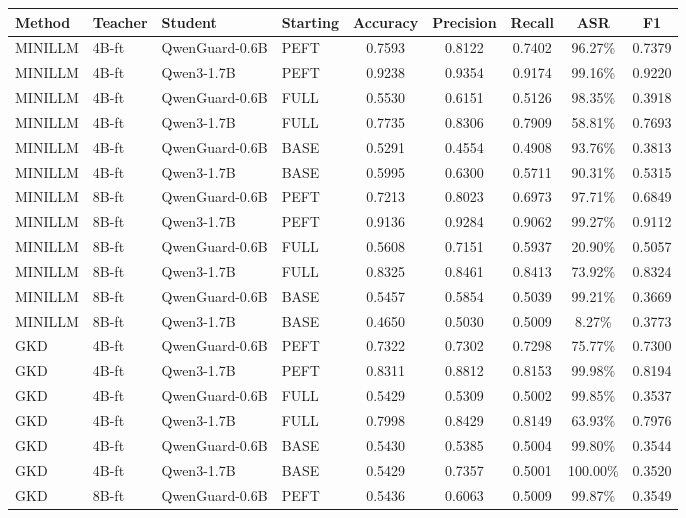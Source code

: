 \begin{table}[t]
\centering
\small
\begin{tabular}{llllccccc}
\toprule
Method & Teacher & Student & Starting & Accuracy & Precision & Recall & ASR & F1 \\
\midrule
MINILLM & 4B-ft & QwenGuard-0.6B & PEFT & 0.7593 & 0.8122 & 0.7402 & 96.27\% & 0.7379 \\
MINILLM & 4B-ft & Qwen3-1.7B & PEFT & 0.9238 & 0.9354 & 0.9174 & 99.16\% & 0.9220 \\
MINILLM & 4B-ft & QwenGuard-0.6B & FULL & 0.5530 & 0.6151 & 0.5126 & 98.35\% & 0.3918 \\
MINILLM & 4B-ft & Qwen3-1.7B & FULL & 0.7735 & 0.8306 & 0.7909 & 58.81\% & 0.7693 \\
MINILLM & 4B-ft & QwenGuard-0.6B & BASE & 0.5291 & 0.4554 & 0.4908 & 93.76\% & 0.3813 \\
MINILLM & 4B-ft & Qwen3-1.7B & BASE & 0.5995 & 0.6300 & 0.5711 & 90.31\% & 0.5315 \\
MINILLM & 8B-ft & QwenGuard-0.6B & PEFT & 0.7213 & 0.8023 & 0.6973 & 97.71\% & 0.6849 \\
MINILLM & 8B-ft & Qwen3-1.7B & PEFT & 0.9136 & 0.9284 & 0.9062 & 99.27\% & 0.9112 \\
MINILLM & 8B-ft & QwenGuard-0.6B & FULL & 0.5608 & 0.7151 & 0.5937 & 20.90\% & 0.5057 \\
MINILLM & 8B-ft & Qwen3-1.7B & FULL & 0.8325 & 0.8461 & 0.8413 & 73.92\% & 0.8324 \\
MINILLM & 8B-ft & QwenGuard-0.6B & BASE & 0.5457 & 0.5854 & 0.5039 & 99.21\% & 0.3669 \\
MINILLM & 8B-ft & Qwen3-1.7B & BASE & 0.4650 & 0.5030 & 0.5009 & 8.27\% & 0.3773 \\
GKD & 4B-ft & QwenGuard-0.6B & PEFT & 0.7322 & 0.7302 & 0.7298 & 75.77\% & 0.7300 \\
GKD & 4B-ft & Qwen3-1.7B & PEFT & 0.8311 & 0.8812 & 0.8153 & 99.98\% & 0.8194 \\
GKD & 4B-ft & QwenGuard-0.6B & FULL & 0.5429 & 0.5309 & 0.5002 & 99.85\% & 0.3537 \\
GKD & 4B-ft & Qwen3-1.7B & FULL & 0.7998 & 0.8429 & 0.8149 & 63.93\% & 0.7976 \\
GKD & 4B-ft & QwenGuard-0.6B & BASE & 0.5430 & 0.5385 & 0.5004 & 99.80\% & 0.3544 \\
GKD & 4B-ft & Qwen3-1.7B & BASE & 0.5429 & 0.7357 & 0.5001 & 100.00\% & 0.3520 \\
GKD & 8B-ft & QwenGuard-0.6B & PEFT & 0.5436 & 0.6063 & 0.5009 & 99.87\% & 0.3549 \\

\end{tabular}
\end{table}
